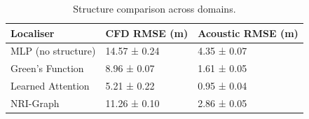 \begin{table}
\caption{Structure comparison across domains.}
\label{tab:architecture-comparison}
\begin{tabular}{lll}
\toprule
Localiser & CFD RMSE (m) & Acoustic RMSE (m) \\
\midrule
MLP (no structure) & 14.57 ± 0.24 & 4.35 ± 0.07 \\
Green's Function & 8.96 ± 0.07 & 1.61 ± 0.05 \\
Learned Attention & 5.21 ± 0.22 & 0.95 ± 0.04 \\
NRI-Graph & 11.26 ± 0.10 & 2.86 ± 0.05 \\
\bottomrule
\end{tabular}
\end{table}
